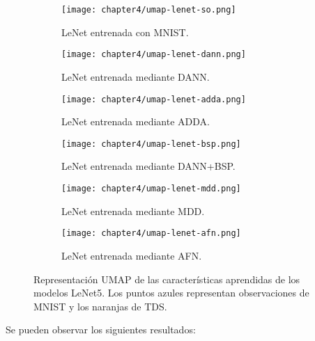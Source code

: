 \begin{figure}[H]
    \centering
    \begin{subfigure}[h]{0.43\textwidth}
        \texttt{[image: chapter4/umap-lenet-so.png]}
        \caption{LeNet entrenada con MNIST.}
        \label{fig:umap-lenet-so}
    \end{subfigure}
    \hfill
    \begin{subfigure}[h]{0.43\textwidth}
        \texttt{[image: chapter4/umap-lenet-dann.png]}
        \caption{LeNet entrenada mediante DANN.}
        \label{fig:umap-lenet-dann}
    \end{subfigure}
    \hfill
    \begin{subfigure}[h]{0.43\textwidth}
        \texttt{[image: chapter4/umap-lenet-adda.png]}
        \caption{LeNet entrenada mediante ADDA.}
        \label{fig:umap-lenet-adda}
    \end{subfigure}
    \hfill
    \begin{subfigure}[h]{0.43\textwidth}
        \texttt{[image: chapter4/umap-lenet-bsp.png]}
        \caption{LeNet entrenada mediante DANN+BSP.}
        \label{fig:umap-lenet-bsp}
    \end{subfigure}
    \hfill
    \begin{subfigure}[h]{0.43\textwidth}
        \texttt{[image: chapter4/umap-lenet-mdd.png]}
        \caption{LeNet entrenada mediante MDD.}
        \label{fig:umap-lenet-mdd}
    \end{subfigure}
    \hfill
    \begin{subfigure}[h]{0.43\textwidth}
        \texttt{[image: chapter4/umap-lenet-afn.png]}
        \caption{LeNet entrenada mediante AFN.}
        \label{fig:umap-lenet-afn}
    \end{subfigure}

    \caption[Representación UMAP de las características aprendidas de los modelos LeNet5]{Representación UMAP de las características aprendidas de los modelos LeNet5. Los puntos azules representan observaciones de MNIST y los naranjas de TDS.}
    \label{fig:umaps-lenet}
\end{figure}

Se pueden observar los siguientes resultados:


